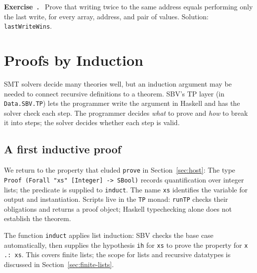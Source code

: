 \documentclass[acmsmall,screen,review,anonymous,nonacm]{acmart}
\newcommand{\code}[1]{\texttt{#1}}
\newcounter{exercise}
\newenvironment{exercise}{\refstepcounter{exercise}\par\medskip\noindent
  \textbf{Exercise~\theexercise.}\ }{\par\medskip}
\begin{document}
\begin{exercise}
Prove that writing twice to the same address equals performing only the last
write, for every array, address, and pair of values. Solution: \code{lastWriteWins}.
\end{exercise}

\section{Proofs by Induction}
\label{sec:induction}

SMT solvers decide many theories well, but an induction argument may be needed
to connect recursive definitions to a theorem. SBV's TP layer (in
\code{Data.SBV.TP}) lets the programmer write the
argument in Haskell and has the solver check each step. The programmer decides
\emph{what} to prove and \emph{how} to break it into steps; the solver decides
whether each step is valid.

\subsection{A first inductive proof}

We return to the property that eluded \code{prove} in Section~\ref{sec:host}:
The type \code{Proof (Forall "xs" [Integer] -> SBool)} records quantification
over integer lists; the predicate is supplied to \code{induct}. The name
\code{xs} identifies the variable for output and instantiation. Scripts live in
the \code{TP} monad: \code{runTP} checks their obligations and returns a proof
object; Haskell typechecking alone does not establish the theorem.

The function \code{induct} applies list induction: SBV checks the
base case automatically, then supplies the hypothesis \code{ih} for \code{xs}
to prove the property for \code{x .: xs}. This covers finite lists; the scope
for lists and recursive datatypes is discussed in Section~\ref{sec:finite-lists}.
\end{document}
